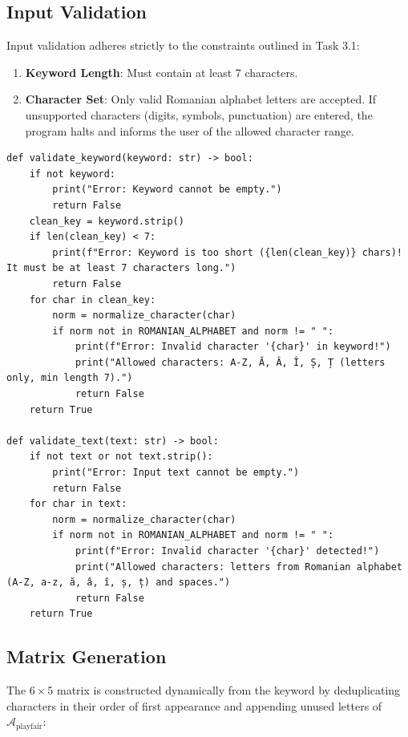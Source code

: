 \documentclass{labreport}
\begin{document}
\subsection{Input Validation}
Input validation adheres strictly to the constraints outlined in Task 3.1:
\begin{enumerate}
    \item \textbf{Keyword Length}: Must contain at least 7 characters.
    \item \textbf{Character Set}: Only valid Romanian alphabet letters are accepted. If unsupported characters (digits, symbols, punctuation) are entered, the program halts and informs the user of the allowed character range.
\end{enumerate}

\begin{lstlisting}[style=python]
def validate_keyword(keyword: str) -> bool:
    if not keyword:
        print("Error: Keyword cannot be empty.")
        return False
    clean_key = keyword.strip()
    if len(clean_key) < 7:
        print(f"Error: Keyword is too short ({len(clean_key)} chars)! It must be at least 7 characters long.")
        return False
    for char in clean_key:
        norm = normalize_character(char)
        if norm not in ROMANIAN_ALPHABET and norm != " ":
            print(f"Error: Invalid character '{char}' in keyword!")
            print("Allowed characters: A-Z, Ă, Â, Î, Ș, Ț (letters only, min length 7).")
            return False
    return True

def validate_text(text: str) -> bool:
    if not text or not text.strip():
        print("Error: Input text cannot be empty.")
        return False
    for char in text:
        norm = normalize_character(char)
        if norm not in ROMANIAN_ALPHABET and norm != " ":
            print(f"Error: Invalid character '{char}' detected!")
            print("Allowed characters: letters from Romanian alphabet (A-Z, a-z, ă, â, î, ș, ț) and spaces.")
            return False
    return True
\end{lstlisting}

\subsection{Matrix Generation}
The $6 \times 5$ matrix is constructed dynamically from the keyword by deduplicating characters in their order of first appearance and appending unused letters of $\mathcal{A}_{\text{playfair}}$:
\end{document}
